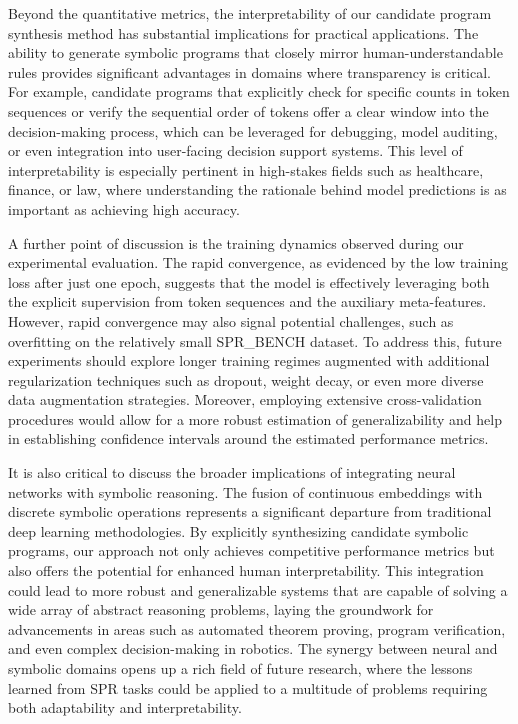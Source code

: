 \documentclass[11pt]{article}
\begin{document}
Beyond the quantitative metrics, the interpretability of our candidate program synthesis method has substantial implications for practical applications. The ability to generate symbolic programs that closely mirror human-understandable rules provides significant advantages in domains where transparency is critical. For example, candidate programs that explicitly check for specific counts in token sequences or verify the sequential order of tokens offer a clear window into the decision-making process, which can be leveraged for debugging, model auditing, or even integration into user-facing decision support systems. This level of interpretability is especially pertinent in high-stakes fields such as healthcare, finance, or law, where understanding the rationale behind model predictions is as important as achieving high accuracy.

A further point of discussion is the training dynamics observed during our experimental evaluation. The rapid convergence, as evidenced by the low training loss after just one epoch, suggests that the model is effectively leveraging both the explicit supervision from token sequences and the auxiliary meta-features. However, rapid convergence may also signal potential challenges, such as overfitting on the relatively small SPR\_BENCH dataset. To address this, future experiments should explore longer training regimes augmented with additional regularization techniques such as dropout, weight decay, or even more diverse data augmentation strategies. Moreover, employing extensive cross-validation procedures would allow for a more robust estimation of generalizability and help in establishing confidence intervals around the estimated performance metrics.

It is also critical to discuss the broader implications of integrating neural networks with symbolic reasoning. The fusion of continuous embeddings with discrete symbolic operations represents a significant departure from traditional deep learning methodologies. By explicitly synthesizing candidate symbolic programs, our approach not only achieves competitive performance metrics but also offers the potential for enhanced human interpretability. This integration could lead to more robust and generalizable systems that are capable of solving a wide array of abstract reasoning problems, laying the groundwork for advancements in areas such as automated theorem proving, program verification, and even complex decision-making in robotics. The synergy between neural and symbolic domains opens up a rich field of future research, where the lessons learned from SPR tasks could be applied to a multitude of problems requiring both adaptability and interpretability.
\end{document}
